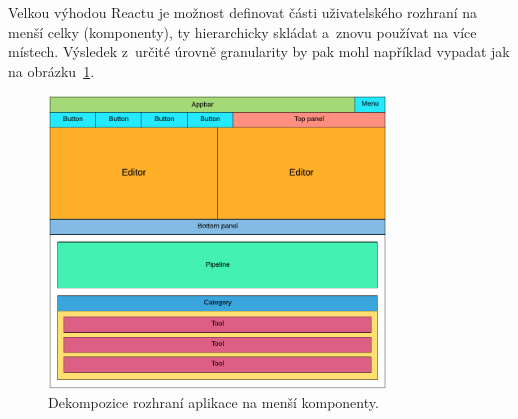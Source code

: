 Velkou výhodou Reactu je možnost definovat části uživatelského rozhraní na menší celky (komponenty), ty hierarchicky skládat a~znovu používat na více místech. Výsledek z~určité úrovně granularity by pak mohl například vypadat jak na obrázku~\ref{obr:Dekompozice rozhraní na menší komponenty}.
\begin{figure}[hbt]
	\centering
	\setlength{\fboxsep}{0pt}
	\includegraphics[width=0.8\textwidth]{obrazky-figures/dekompozice_rozhrani.pdf}
	\caption{Dekompozice rozhraní aplikace na menší komponenty.}
	\label{obr:Dekompozice rozhraní na menší komponenty}
\end{figure}

